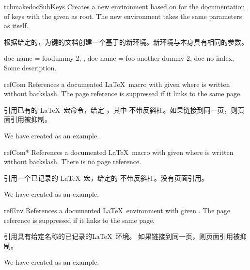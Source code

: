 \begin{docCommand}[doc new=2020-04-22]{tcbmakedocSubKeys}{}
Creates a new environment  based on  for the
documentation of keys with the given  as root.
The new environment  takes the same para\-meters as  itself.

根据给定的，为键的文档创建一个基于的新环境。新环境与本身具有相同的参数。
\begin{dispExample}

\begin{docFooKeys}[
  doc parameter   = {=\meta{nothing}},
  doc description = {no default, initially empty},
]
{
  {
    doc name = foodummy 2,
  },
  {
    doc name = foo another dummy 2,
    doc no index,
  }
}
Some description.
\end{docFooKeys}
\end{dispExample}
\end{docCommand}



\begin{docCommand}{refCom}{}
References a documented \LaTeX\ macro with given  where  is
written without backslash. The page reference is suppressed if it links
to the same page.

引用已有的 \LaTeX\ 宏命令，给定 ，其中  不带反斜杠。如果链接到同一页，则页面引用被抑制。
\begin{dispExample}
We have created  as an example.
\end{dispExample}
\end{docCommand}

\begin{docCommand}{refCom*}{}
References a documented \LaTeX\ macro with given  where  is
written without backslash. There is no page reference.

引用一个已记录的 \LaTeX\ 宏，给定的  不带反斜杠。没有页面引用。
\begin{dispExample}
We have created  as an example.
\end{dispExample}
\end{docCommand}


\begin{docCommand}{refEnv}{}
References a documented \LaTeX\ environment with given .
The page reference is suppressed if it links to the same page.

引用具有给定名称的已记录的\LaTeX\ 环境。 如果链接到同一页，则页面引用被抑制。
\begin{dispExample}
We have created  as an example.
\end{dispExample}
\end{docCommand}

